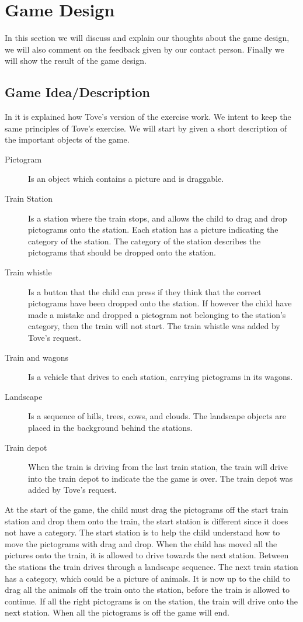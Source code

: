 \section{Game Design}
In this section we will discuss and explain our thoughts about the game design, we will also comment on the feedback given by our contact person. Finally we will show the result of the game design.
\subsection{Game Idea/Description}\label{sec:gameidea}
In  it is explained how Tove's version of the exercise work. We intent to keep the same principles of Tove's exercise. We will start by given a short description of the important objects of the game.
\begin{description}
\item[Pictogram] Is an object which contains a picture and is draggable.
\item[Train Station] Is a station where the train stops, and allows the child to drag and drop pictograms onto the station. Each station has a picture indicating the category of the station. The category of the station describes the pictograms that should be dropped onto the station.  

\item[Train whistle] Is a button that the child can press if they think that the correct pictograms have been dropped onto the station. If however the child have made a mistake and dropped a pictogram not belonging to the station's category, then the train will not start. The train whistle was added by Tove's request.

\item[Train and wagons] Is a vehicle that drives to each station, carrying pictograms in its wagons.

\item[Landscape] Is a sequence of hills, trees, cows, and clouds. The landscape objects are placed in the background behind the stations.

\item[Train depot] When the train is driving from the last train station, the train will drive into the train depot to indicate the the game is over. The train depot was added by Tove's request.
\end{description}
At the start of the game, the child must drag the pictograms off the start train station and drop them onto the train, the start station is different since it does not have a category. The start station is to help the child understand how to move the pictograms with drag and drop. When the child has moved all the pictures onto the train, it is allowed to drive towards the next station. Between the stations the train drives through a landscape sequence. The next train station has a category, which could be a picture of animals. It is now up to the child to drag all the animals off the train onto the station, before the train is allowed to continue. If all the right pictograms is on the station, the train will drive onto the next station. When all the pictograms is off the game will end.

